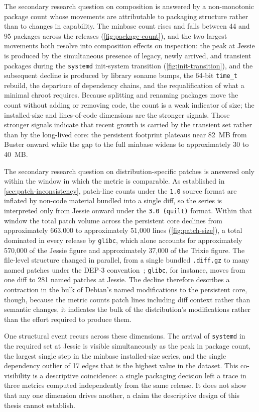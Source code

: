 The secondary research question on composition is answered by a non-monotonic package count whose movements are attributable to packaging structure rather than to changes in capability. The minbase count rises and falls between 44 and 95 packages across the releases (\autoref{fig:package-count}), and the two largest movements both resolve into composition effects on inspection: the peak at Jessie is produced by the simultaneous presence of legacy, newly arrived, and transient packages during the \texttt{systemd} init-system transition (\autoref{fig:init-transition}), and the subsequent decline is produced by library soname bumps, the 64-bit \texttt{time\_t} rebuild, the departure of dependency chains, and the requalification of what a minimal chroot requires. Because splitting and renaming packages move the count without adding or removing code, the count is a weak indicator of size; the installed-size and lines-of-code dimensions are the stronger signals. Those stronger signals indicate that recent growth is carried by the transient set rather than by the long-lived core: the persistent footprint plateaus near 82~MB from Buster onward while the gap to the full minbase widens to approximately 30 to 40~MB.

The secondary research question on distribution-specific patches is answered only within the window in which the metric is comparable. As established in \autoref{sec:patch-inconsistency}, patch-line counts under the \texttt{1.0} source format are inflated by non-code material bundled into a single diff, so the series is interpreted only from Jessie onward under the \texttt{3.0 (quilt)} format. Within that window the total patch volume across the persistent core declines from approximately 663{,}000 to approximately 51{,}000 lines (\autoref{fig:patch-size}), a total dominated in every release by \texttt{glibc}, which alone accounts for approximately 570{,}000 of the Jessie figure and approximately 37{,}000 of the Trixie figure. The file-level structure changed in parallel, from a single bundled \texttt{.diff.gz} to many named patches under the DEP-3 convention~\cite{dep3}; \texttt{glibc}, for instance, moves from one diff to 281 named patches at Jessie. The decline therefore describes a contraction in the bulk of Debian's named modifications to the persistent core, though, because the metric counts patch lines including diff context rather than semantic changes, it indicates the bulk of the distribution's modifications rather than the effort required to produce them.

One structural event recurs across these dimensions. The arrival of \texttt{systemd} in the required set at Jessie is visible simultaneously as the peak in package count, the largest single step in the minbase installed-size series, and the single dependency outlier of 17 edges that is the highest value in the dataset. This co-visibility is a descriptive coincidence: a single packaging decision left a trace in three metrics computed independently from the same release. It does not show that any one dimension drives another, a claim the descriptive design of this thesis cannot establish.

